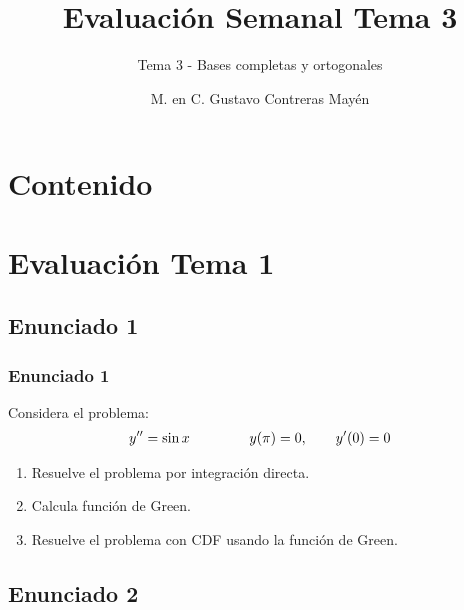 \documentclass[12pt]{beamer}
\title{\large{Evaluación Semanal Tema 3}}
\subtitle{Tema 3 - Bases completas y ortogonales}
\author{M. en C. Gustavo Contreras Mayén}
\date{}
\begin{document}
\maketitle
\fontsize{14}{14}\selectfont
{}

\section*{Contenido}

\section{Evaluación Tema 1}
\subsection{Enunciado 1}

\begin{frame}
\frametitle{Enunciado 1}
Considera el problema:
\begin{align*}
{y}^{\prime \prime} = \sin x \hspace{1.5cm} y (\pi) = 0, \hspace{0.7cm} {y}^{\prime} (0) = 0
\end{align*}
\pause
{}
\begin{enumerate}[<+->]
\item Resuelve el problema por integración directa.
\item Calcula función de Green.
\item Resuelve el problema con CDF usando la función de Green.
\end{enumerate}
\end{frame}


\subsection{Enunciado 2}
\end{document}

